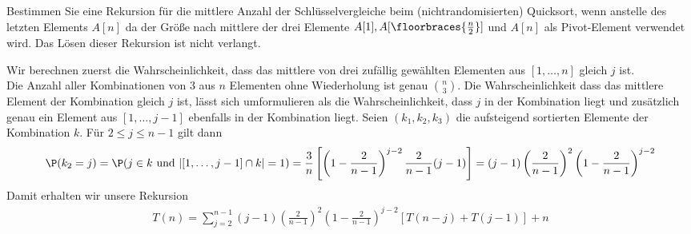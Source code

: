 
\begin{exercise}

Bestimmen Sie eine Rekursion für die mittlere Anzahl der Schlüsselvergleiche beim
(nichtrandomisierten) Quicksort, wenn anstelle des letzten Elements $A[n]$ da
der Größe nach mittlere der drei Elemente $A[1],A[\floorbraces{\frac{n}{2}}]$
und $A[n]$ als Pivot-Element verwendet wird. Das Lösen dieser Rekursion ist nicht
verlangt.

\end{exercise}



\begin{solution}

Wir berechnen zuerst die Wahrscheinlichkeit, dass das mittlere von drei zufällig
gewählten Elementen aus $[1,\dots,n]$ gleich $j$ ist. \\
Die Anzahl aller Kombinationen von $3$ aus $n$ Elementen ohne Wiederholung ist genau $\binom{n}{3}$.
Die Wahrscheinlichkeit dass das mittlere Element der Kombination gleich $j$ ist,
lässt sich umformulieren als die Wahrscheinlichkeit, dass $j$ in der Kombination liegt
und zusätzlich genau ein Element aus $[1,\dots,j-1]$ ebenfalls in der Kombination liegt.
Seien $(k_1,k_2,k_3)$ die aufsteigend sortierten Elemente der Kombination $k$.
Für $2 \leq j \leq n - 1$ gilt dann
\begin{align*}
  \P(k_2 = j) = \P(j \in k \text{ und } |[1,\dots,j-1]\cap k| = 1)
  = \frac{3}{n}\left[\left(1- \frac{2}{n-1}\right)^{j-2}\frac{2}{n-1}(j-1)\right]
  =(j-1)\left(\frac{2}{n-1}\right)^{2}\left(1- \frac{2}{n-1}\right)^{j-2}
\end{align*}
Damit erhalten wir unsere Rekursion
\begin{align*}
  T(n) = \sum_{j=2}^{n-1}(j-1)\left(\frac{2}{n-1}\right)^{2}\left(1- \frac{2}{n-1}\right)^{j-2}
  [T(n-j) + T(j - 1)] + n
\end{align*}
\end{solution}


